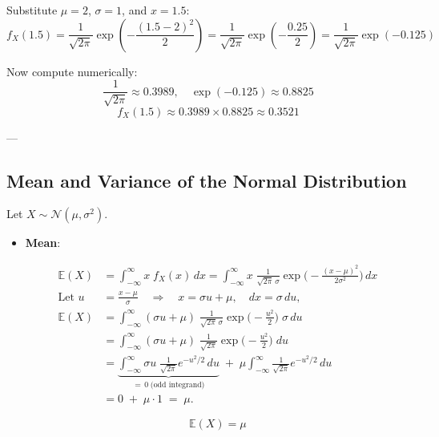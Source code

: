 \documentclass[twoside]{book}
\begin{document}
Substitute $\mu = 2$, $\sigma = 1$, and $x = 1.5$:
\[
f_X(1.5) = \frac{1}{\sqrt{2\pi}} \exp\left( -\frac{(1.5 - 2)^2}{2} \right)
= \frac{1}{\sqrt{2\pi}} \exp\left( -\frac{0.25}{2} \right)
= \frac{1}{\sqrt{2\pi}} \exp(-0.125)
\]

Now compute numerically:
\[
\frac{1}{\sqrt{2\pi}} \approx 0.3989, \quad \exp(-0.125) \approx 0.8825
\]
\[
f_X(1.5) \approx 0.3989 \times 0.8825 \approx 0.3521
\]

---

\subsection{Mean and Variance of the Normal Distribution}

Let $X \sim \mathcal{N}(\mu, \sigma^2)$.

\begin{itemize}
    \item \textbf{Mean}:

    \begin{align*}
    \mathbb{E}(X)
    &= \int_{-\infty}^{\infty} x \; f_X(x)\,dx
    = \int_{-\infty}^{\infty} x \;\frac{1}{\sqrt{2\pi}\,\sigma}
    \exp\!\biggl(-\frac{(x-\mu)^2}{2\sigma^2}\biggr)\,dx \\[6pt]
    \text{Let } u &= \frac{x - \mu}{\sigma}
    \quad\Longrightarrow\quad
    x = \sigma u + \mu,
    \quad dx = \sigma\,du, \\[3pt]
    \mathbb{E}(X) &= \int_{-\infty}^{\infty}
    (\sigma u + \mu)\;
    \frac{1}{\sqrt{2\pi}\,\sigma}
    \exp\!\bigl(-\tfrac{u^2}{2}\bigr)\;\sigma\,du \\[6pt]
    &= \int_{-\infty}^{\infty}
    (\sigma u + \mu)\;
    \frac{1}{\sqrt{2\pi}}
    \exp\!\bigl(-\tfrac{u^2}{2}\bigr)\;du \\[6pt]
    &= \underbrace{\int_{-\infty}^{\infty}
    \sigma u \;\frac{1}{\sqrt{2\pi}}
    e^{-u^2/2}\,du}_{=\,0\;\text{(odd integrand)}}
    \;+\;
    \mu \int_{-\infty}^{\infty}
    \frac{1}{\sqrt{2\pi}}
    e^{-u^2/2}\,du \\[6pt]
    &= 0 \;+\; \mu \cdot 1
    \;=\; \mu.
    \end{align*}

    \begin{textbox}
        \[
        \mathbb{E}(X) = \mu
        \]
        \end{textbox}



\end{itemize}
\end{document}
